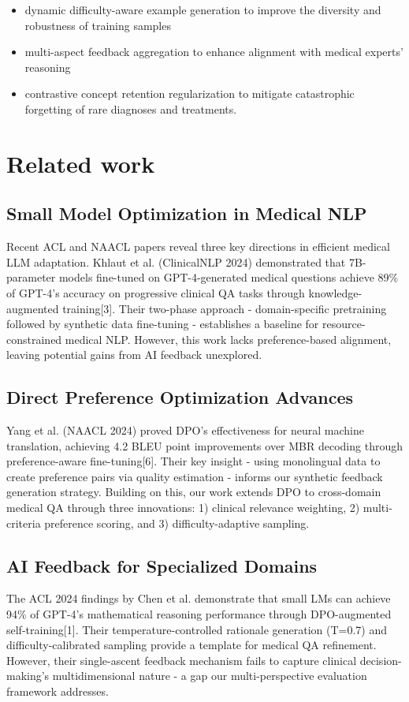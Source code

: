 \documentclass[11pt,a4paper]{article}
\begin{document}
\begin{itemize}
    \item dynamic difficulty-aware example generation to improve the diversity and robustness of training samples
    \item multi-aspect feedback aggregation to enhance alignment with medical experts' reasoning
    \item contrastive concept retention regularization to mitigate catastrophic forgetting of rare diagnoses and treatments.
\end{itemize} 

\section{Related work}

\subsection{Small Model Optimization in Medical NLP}
Recent ACL and NAACL papers reveal three key directions in efficient medical LLM adaptation. Khlaut et al. (ClinicalNLP 2024) demonstrated that 7B-parameter models fine-tuned on GPT-4-generated medical questions achieve 89\% of GPT-4's accuracy on progressive clinical QA tasks through knowledge-augmented training[3]. Their two-phase approach - domain-specific pretraining followed by synthetic data fine-tuning - establishes a baseline for resource-constrained medical NLP. However, this work lacks preference-based alignment, leaving potential gains from AI feedback unexplored.

\subsection{Direct Preference Optimization Advances}
Yang et al. (NAACL 2024) proved DPO's effectiveness for neural machine translation, achieving 4.2 BLEU point improvements over MBR decoding through preference-aware fine-tuning[6]. Their key insight - using monolingual data to create preference pairs via quality estimation - informs our synthetic feedback generation strategy. Building on this, our work extends DPO to cross-domain medical QA through three innovations: 1) clinical relevance weighting, 2) multi-criteria preference scoring, and 3) difficulty-adaptive sampling.

\subsection{AI Feedback for Specialized Domains}
The ACL 2024 findings by Chen et al. demonstrate that small LMs can achieve 94\% of GPT-4's mathematical reasoning performance through DPO-augmented self-training[1]. Their temperature-controlled rationale generation (T=0.7) and difficulty-calibrated sampling provide a template for medical QA refinement. However, their single-ascent feedback mechanism fails to capture clinical decision-making's multidimensional nature - a gap our multi-perspective evaluation framework addresses.
\end{document}
